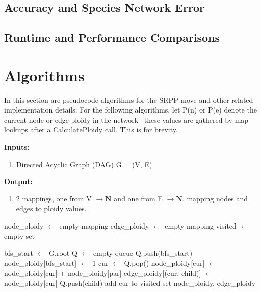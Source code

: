 \documentclass{article}
\begin{document}
\subsection{\color{bluem}Accuracy and Species Network Error}

\subsection{\color{bluem}Runtime and Performance Comparisons}


\section{Algorithms} \label{Algs}
In this section are pseudocode algorithms for the SRPP move and other related implementation details. For the following algorithms, let P(n) or P(e) denote the current node or edge ploidy in the network-- these values are gathered by map lookups after a CalculatePloidy call. This is for brevity.

\begin{algorithm}[H]
\caption{CalculatePloidy}\label{euclid}

\textbf{Inputs:} 
\begin{enumerate}
    \item Directed Acyclic Graph (DAG) G = (V, E)
    
\end{enumerate}
\textbf{Output:}
\begin{enumerate}
    \item 2 mappings, one from V $\rightarrow \mathbf{N}$ and one from E $\rightarrow \mathbf{N}$, mapping nodes and edges to ploidy values.
\end{enumerate}

  \begin{algorithmic}[1]
        \State node\_ploidy $\gets$ empty mapping
        \State edge\_ploidy $\gets$ empty mapping
        \State visited $\gets$ empty set
        
        \State bfs\_start $\gets$ G.root
        \State Q $\gets$ empty queue
        \State Q.push(bfs\_start)
        \State node\_ploidy[bfs\_start] $\gets$ 1 
            \State cur $\gets$ Q.pop()
                 
                    \State node\_ploidy[cur] $\gets$ node\_ploidy[cur] + node\_ploidy[par] 
                \EndFor
                 
                    \State edge\_ploidy[(cur, child)] $\gets$ node\_ploidy[cur]
                    \State Q.push(child)
                \EndFor
            \EndIf
            \State add cur to visited set
        \EndWhile
    \State \Return node\_ploidy, edge\_ploidy
    \EndProcedure
  \end{algorithmic}


\end{algorithm}
\end{document}
